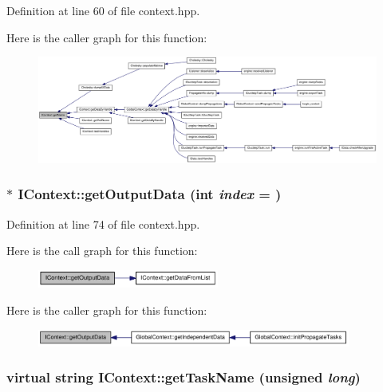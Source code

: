 Definition at line 60 of file context.hpp.

Here is the caller graph for this function:\nopagebreak
\begin{figure}[H]
\begin{center}
\leavevmode
\includegraphics[width=420pt]{class_i_context_a607d8609c589bfa7937b5a8313c61d04_icgraph}
\end{center}
\end{figure}
\hypertarget{class_i_context_adc30ba64c308b29d60494a0d3ce26852}{
\subsubsection[{getOutputData}]{$\ast$ IContext::getOutputData (int {\em index} = {})}}
\label{class_i_context_adc30ba64c308b29d60494a0d3ce26852}


Definition at line 74 of file context.hpp.

Here is the call graph for this function:\nopagebreak
\begin{figure}[H]
\begin{center}
\leavevmode
\includegraphics[width=169pt]{class_i_context_adc30ba64c308b29d60494a0d3ce26852_cgraph}
\end{center}
\end{figure}


Here is the caller graph for this function:\nopagebreak
\begin{figure}[H]
\begin{center}
\leavevmode
\includegraphics[width=292pt]{class_i_context_adc30ba64c308b29d60494a0d3ce26852_icgraph}
\end{center}
\end{figure}
\hypertarget{class_i_context_a8f811884fc095b04c6f6f7df5be5b51d}{
\subsubsection[{getTaskName}]{\setlength{\rightskip}{0pt plus 5cm}virtual string IContext::getTaskName (unsigned {\em long})}}
\label{class_i_context_a8f811884fc095b04c6f6f7df5be5b51d}


